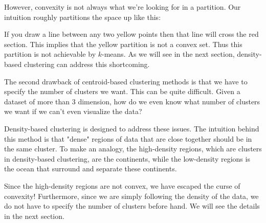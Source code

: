 However, convexity is not always what we're looking for in a partition. Our intuition
roughly partitions the space up like this:

If you draw a line between any two yellow points then that line will
cross the red section. This implies that the yellow partition is not a convex
set. Thus this partition is not achievable by $k$-means. As we will see
in the next section, density-based clustering can address this shortcoming.

The second drawback of centroid-based clustering methods is that we have
to specify the number of clusters we want. This can be quite difficult. Given
a dataset of more than 3 dimension, how do we even know what number of clusters
we want if we can't even visualize the data?

Density-based clustering is designed to address these issues. 
The intuition behind this method is that "dense" regions of data
that are close together should be in the same cluster. To make an analogy,
the high-density regions, which are clusters in density-based clustering, are the continents,
while the low-density regions is the ocean that surround and separate these
continents.

Since the high-density regions are not convex, we have escaped the curse of
convexity! Furthermore, since we are simply following the density of the data,
we do not have to specify the number of clusters before hand. We will see the
details in the next section.
